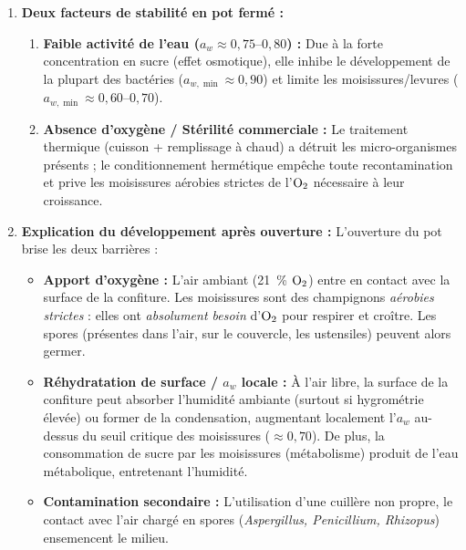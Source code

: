\documentclass[11pt]{article}
\begin{document}
\begin{corrige}
\begin{enumerate}
\item \textbf{Deux facteurs de stabilité en pot fermé :}
\begin{enumerate}
\item \textbf{Faible activité de l'eau ($a_w \approx 0,75\text{--}0,80$) :} Due à la forte concentration en sucre (effet osmotique), elle inhibe le développement de la plupart des bactéries ($a_{w,\min} \approx 0,90$) et limite les moisissures/levures ($a_{w,\min} \approx 0,60\text{--}0,70$).
\item \textbf{Absence d'oxygène / Stérilité commerciale :} Le traitement thermique (cuisson + remplissage à chaud) a détruit les micro-organismes présents ; le conditionnement hermétique empêche toute recontamination et prive les moisissures aérobies strictes de l'$\ce{O2}$ nécessaire à leur croissance.
\end{enumerate}

\item \textbf{Explication du développement après ouverture :}
L'ouverture du pot brise les deux barrières :
\begin{itemize}
\item \textbf{Apport d'oxygène :} L'air ambiant (\SI{21}{\%} $\ce{O2}$) entre en contact avec la surface de la confiture. Les moisissures sont des champignons \emph{aérobies strictes} : elles ont \emph{absolument besoin} d'$\ce{O2}$ pour respirer et croître. Les spores (présentes dans l'air, sur le couvercle, les ustensiles) peuvent alors germer.
\item \textbf{Réhydratation de surface / $a_w$ locale :} À l'air libre, la surface de la confiture peut absorber l'humidité ambiante (surtout si hygrométrie élevée) ou former de la condensation, augmentant localement l'$a_w$ au-dessus du seuil critique des moisissures ($\approx 0,70$). De plus, la consommation de sucre par les moisissures (métabolisme) produit de l'eau métabolique, entretenant l'humidité.
\item \textbf{Contamination secondaire :} L'utilisation d'une cuillère non propre, le contact avec l'air chargé en spores (\emph{Aspergillus, Penicillium, Rhizopus}) ensemencent le milieu.
\end{itemize}


\end{enumerate}
\end{corrige}
\end{document}
